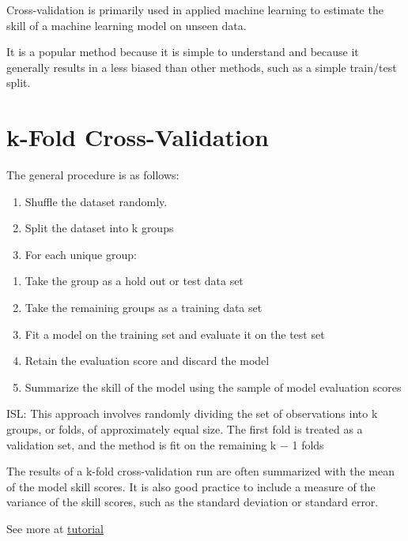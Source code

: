 \documentclass[
]{book}
\providecommand{\tightlist}{%
  \setlength{\itemsep}{0pt}\setlength{\parskip}{0pt}}
\begin{document}
Cross-validation is primarily used in applied machine learning to estimate the skill of a machine learning model on unseen data.

It is a popular method because it is simple to understand and because it generally results in a less biased than other methods, such as a simple train/test split.

\hypertarget{k-fold-cross-validation}{%
\section{k-Fold Cross-Validation}\label{k-fold-cross-validation}}

The general procedure is as follows:

\begin{enumerate}
\def\labelenumi{\arabic{enumi}.}
\tightlist
\item
  Shuffle the dataset randomly.\\
\item
  Split the dataset into k groups\\
\item
  For each unique group:
\end{enumerate}

\begin{enumerate}
\def\labelenumi{\alph{enumi}.}
\tightlist
\item
  Take the group as a hold out or test data set
\item
  Take the remaining groups as a training data set
\item
  Fit a model on the training set and evaluate it on the test set
\item
  Retain the evaluation score and discard the model
\item
  Summarize the skill of the model using the sample of model evaluation scores
\end{enumerate}

ISL: This approach involves randomly dividing the set of observations into k groups, or folds, of approximately equal size. The first fold is treated as a validation set, and the method is fit on the remaining k − 1 folds

The results of a k-fold cross-validation run are often summarized with the mean of the model skill scores. It is also good practice to include a measure of the variance of the skill scores, such as the standard deviation or standard error.

See more at \href{https://machinelearningmastery.com/k-fold-cross-validation/}{tutorial}

  
\end{document}

